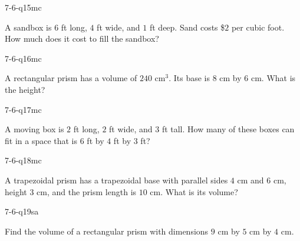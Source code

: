 \begin{practiceQuestion}{7-6-q15}{mc}
\begin{questionText}
A sandbox is $6$ ft long, $4$ ft wide, and $1$ ft deep. Sand costs \$$2$ per cubic foot. How much does it cost to fill the sandbox?
\end{questionText}
\end{practiceQuestion}

\begin{practiceQuestion}{7-6-q16}{mc}
\begin{questionText}
A rectangular prism has a volume of $240$ cm$^3$. Its base is $8$ cm by $6$ cm. What is the height?
\end{questionText}
\end{practiceQuestion}

\begin{practiceQuestion}{7-6-q17}{mc}
\begin{questionText}
A moving box is $2$ ft long, $2$ ft wide, and $3$ ft tall. How many of these boxes can fit in a space that is $6$ ft by $4$ ft by $3$ ft?
\end{questionText}
\end{practiceQuestion}

\begin{practiceQuestion}{7-6-q18}{mc}
\begin{questionText}
A trapezoidal prism has a trapezoidal base with parallel sides $4$ cm and $6$ cm, height $3$ cm, and the prism length is $10$ cm. What is its volume?
\end{questionText}
\end{practiceQuestion}


\begin{practiceQuestion}{7-6-q19}{sa}
\begin{questionText}
Find the volume of a rectangular prism with dimensions $9$ cm by $5$ cm by $4$ cm.
\end{questionText}
\end{practiceQuestion}

